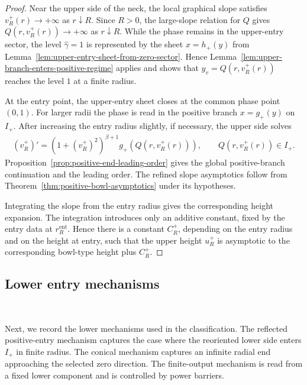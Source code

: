 \documentclass{amsart}
\theoremstyle{plain}
\theoremstyle{mainintrothm}
\theoremstyle{definition}
\begin{document}
\begin{proof}
	Near the upper side of the neck, the local graphical slope satisfies
	$v_R^+(r)\to+\infty$ as $r\downarrow R$.  Since $R>0$, the large-slope
	relation for $Q$ gives $Q(r,v_R^+(r))\to+\infty$ as $r\downarrow R$.
	While the phase remains in the upper-entry sector, the level
	$\widehat\gamma=1$ is represented by the sheet $x=h_+(y)$ from
	Lemma~\ref{lem:upper-entry-sheet-from-zero-sector}.  Hence
	Lemma~\ref{lem:upper-branch-enters-positive-regime} applies and shows that
	$y_v=Q(r,v_R^+(r))$ reaches the level $1$ at a finite radius.
	
	\medskip
	
	At the entry point, the upper-entry sheet closes at the common phase point
	$(0,1)$.  For larger radii the phase is read in the positive branch
	$x=g_+(y)$ on $I_+$.  After increasing the entry radius slightly, if
	necessary, the upper side solves
	\begin{align*}
		(v_R^+)'
		=
		(1+(v_R^+)^2)^{\beta+1}
		g_+(Q(r,v_R^+(r))),
		\qquad
		Q(r,v_R^+(r))\in I_+.
	\end{align*}
	Proposition~\ref{prop:positive-end-leading-order} gives the global
	positive-branch continuation and the leading order.  The refined slope
	asymptotics follow from Theorem~\ref{thm:positive-bowl-asymptotics} under its
	hypotheses.
	
	\medskip
	
	Integrating the slope from the entry radius gives the corresponding height
	expansion.  The integration introduces only an additive constant, fixed by the
	entry data at $r_R^{\mathrm{ent}}$.  Hence there is a constant $C_R^+$, depending
	on the entry radius and on the height at entry, such that the upper height
	$u_R^+$ is asymptotic to the corresponding bowl-type height plus $C_R^+$.
\end{proof}

\subsection{Lower entry mechanisms}\,
\label{subsec:lower-entry-mechanisms}

Next, we record the lower mechanisms used in the classification.  The reflected
positive-entry mechanism captures the case where the reoriented lower side
enters $I_+$ in finite radius.  The conical mechanism captures an infinite
radial end approaching the selected zero direction.  The finite-output
mechanism is read from a fixed lower component and is controlled by power
barriers.
\end{document}
